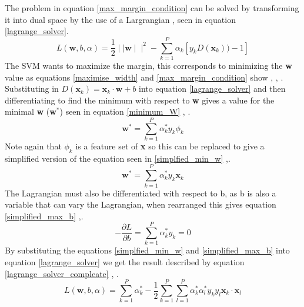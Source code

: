 \documentclass[12pt,a4paper]{article}
\begin{document}
The problem in equation \ref{max_margin_condition} can be solved by transforming it into dual space by the use of a Largrangian \cite{kernelSVMs1992}, \cite{svm_book} seen in equation \ref{lagrange_solver}.
\begin{equation}
L (\textbf{w},b,\alpha) = \frac{1}{2} \mid\mid \textbf{w} \mid\mid ^2 - \sum_{k=1}^{P} \alpha_k [y_kD(\textbf{x$_k$}))-1]
\label{lagrange_solver}
\end{equation}
The SVM wants to maximize the margin, this corresponds to minimizing the \textbf{w} value as equations \ref{maximise_width} and \ref{max_margin_condition} show \cite{kernelSVMs1992}, \cite{mitLecture}, \cite{svm_book}. Substituting in $D(\textbf{x$_k$}) = \textbf{x$_k$} \cdot \textbf{w} + b$ into equation \ref{lagrange_solver} and then differentiating to find the minimum with respect to \textbf{w} gives a value for the minimal \textbf{w} (\textbf{w$^*$}) seen in equation \ref{minimum_W} \cite{kernelSVMs1992}, \cite{mitLecture}.
\begin{equation}
\textbf{w}^* = \sum_{k=1}^{P} \alpha^*_k y_k \phi_k
\label{minimum_W}
\end{equation}
Note again that $\phi_k$ is a feature set of \textbf{x} so this can be replaced to give a simplified version of the equation seen in \ref{simplfied_min_w} \cite{mitLecture},\cite{svm_book}.
\begin{equation}
\textbf{w}^* = \sum_{k=1}^{P} \alpha^*_k y_k \textbf{x$_k$}
\label{simplfied_min_w}
\end{equation}
The Lagrangian must also be differentiated with respect to b, as b is also a variable that can vary the Lagrangian, when rearranged this gives equation \ref{simplified_max_b} \cite{mitLecture} ,\cite{svm_book}.
\begin{equation}
- \frac {\partial{L}}{\partial{b}} = \sum_{k=1}^{P} \alpha^*_k y_k = 0 
\label{simplified_max_b}
\end{equation}
By substituting the equations \ref{simplfied_min_w} and \ref{simplified_max_b} into equation \ref{lagrange_solver} we get the result described by equation \ref{lagrange_solver_compleate} \cite{mitLecture}, \cite{svm_book}.
\begin{equation} 
L (\textbf{w},b,\alpha) = \sum_{k=1}^{P} \alpha^*_k - \frac{1}{2}  \sum_{k=1}^{P} \sum_{l=1}^{P} \alpha^*_k \alpha^*_l y_k y_l  \textbf{x$_k$} \cdot \textbf{x$_l$}
\label{lagrange_solver_compleate}
\end{equation}
\end{document}
